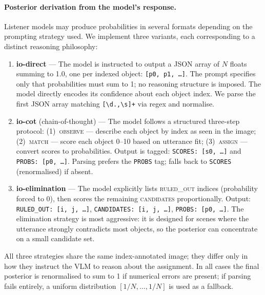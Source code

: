 \documentclass[11pt]{article}
\begin{document}
\paragraph{Posterior derivation from the model's response.}
Listener models may produce probabilities in several formats depending on the
prompting strategy used.  We implement three variants, each corresponding to
a distinct reasoning philosophy:

\begin{enumerate}
\item \textbf{io-direct} --- The model is instructed to output a JSON array of
      $N$ floats summing to 1.0, one per indexed object:
      \texttt{[p0, p1, \ldots]}.
      The prompt specifies only that probabilities must sum to 1; no reasoning
      structure is imposed.  The model directly encodes its confidence about
      each object index.  We parse the first JSON array matching
      \texttt{[\textbackslash d.,\textbackslash s]+} via regex and normalise.

\item \textbf{io-cot} (chain-of-thought) --- The model follows a structured
      three-step protocol: (1)~\textsc{observe} --- describe each object by
      index as seen in the image; (2)~\textsc{match} --- score each object
      0--10 based on utterance fit; (3)~\textsc{assign} --- convert scores
      to probabilities.
      Output is tagged: \texttt{SCORES: [s0, \ldots]} and
      \texttt{PROBS: [p0, \ldots]}.
      Parsing prefers the \texttt{PROBS} tag; falls back to \texttt{SCORES}
      (renormalised) if absent.

\item \textbf{io-elimination} --- The model explicitly lists \textsc{ruled\_out}
      indices (probability forced to 0), then scores the remaining
      \textsc{candidates} proportionally.
      Output: \texttt{RULED\_OUT: [i, j, \ldots]},
      \texttt{CANDIDATES: [i, j, \ldots]},
      \texttt{PROBS: [p0, \ldots]}.
      The elimination strategy is most aggressive: it is designed for scenes
      where the utterance strongly contradicts most objects, so the posterior
      can concentrate on a small candidate set.
\end{enumerate}

All three strategies share the same index-annotated image; they differ only in
how they instruct the VLM to reason about the assignment.
In all cases the final posterior is renormalised to sum to 1 if numerical
errors are present; if parsing fails entirely, a uniform distribution
$[1/N, \ldots, 1/N]$ is used as a fallback.
\end{document}
